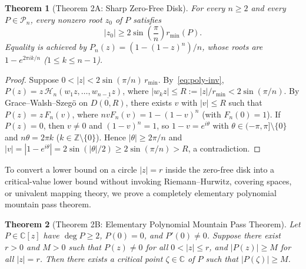 \documentclass[11pt,a4paper]{article}
\newtheorem{theorem}{Theorem}[section]
\theoremstyle{definition}
\theoremstyle{remark}
\newcommand{\CC}{\mathbb{C}}
\begin{document}
\begin{theorem}[Theorem 2A: Sharp Zero-Free Disk]
\label{thm:zero-free}
For every $n \ge 2$ and every $P \in \mathcal{P}_n$, every nonzero root $z_0$ of $P$ satisfies
\[
|z_0| \ge 2 \sin\!\left(\frac{\pi}{n}\right) r_{\min}(P).
\]
Equality is achieved by $P_n(z) = (1 - (1 - z)^n)/n$, whose roots are $1 - e^{2\pi i k/n}$ ($1 \le k \le n - 1$).
\end{theorem}

\begin{proof}
Suppose $0 < |z| < 2\sin(\pi/n)\, r_{\min}$. By~\eqref{eq:poly-inv}, $P(z) = z\,\mathcal{H}_n(w_1 z, \dots, w_{n-1} z)$, where $|w_k z| \le R := |z|/r_{\min} < 2\sin(\pi/n)$. By Grace--Walsh--Szeg\"o on $\overline{D(0, R)}$, there exists $v$ with $|v| \le R$ such that $P(z) = z\, F_n(v)$, where $n v F_n(v) = 1 - (1 - v)^n$ (with $F_n(0) = 1$). If $P(z) = 0$, then $v \neq 0$ and $(1 - v)^n = 1$, so $1 - v = e^{i\theta}$ with $\theta \in (-\pi, \pi] \setminus \{0\}$ and $n\theta = 2\pi k$ ($k \in \mathbb{Z} \setminus \{0\}$). Hence $|\theta| \ge 2\pi/n$ and $|v| = |1 - e^{i\theta}| = 2\sin(|\theta|/2) \ge 2\sin(\pi/n) > R$, a contradiction.
\end{proof}

To convert a lower bound on a circle $|z| = r$ inside the zero-free disk into a critical-value lower bound without invoking Riemann--Hurwitz, covering spaces, or univalent mapping theory, we prove a completely elementary polynomial mountain pass theorem.

\begin{theorem}[Theorem 2B: Elementary Polynomial Mountain Pass Theorem]
\label{thm:mountain-pass}
Let $P \in \CC[z]$ have $\deg P \ge 2$, $P(0) = 0$, and $P'(0) \neq 0$. Suppose there exist $r > 0$ and $M > 0$ such that $P(z) \neq 0$ for all $0 < |z| \le r$, and $|P(z)| \ge M$ for all $|z| = r$. Then there exists a critical point $\zeta \in \CC$ of $P$ such that $|P(\zeta)| \ge M$.
\end{theorem}
\end{document}

